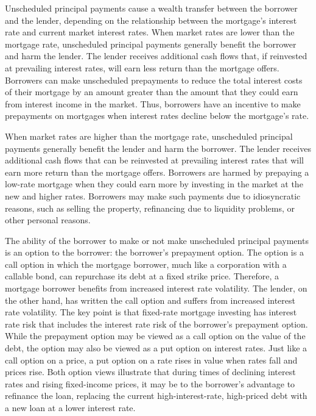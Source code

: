 \documentclass[11pt]{article}
\begin{document}
Unscheduled principal payments cause a wealth transfer between the borrower and the lender, depending on the relationship between the mortgage's interest rate and current market interest rates. When market rates are lower than the mortgage rate, unscheduled principal payments generally benefit the borrower and harm the lender. The lender receives additional cash flows that, if reinvested at prevailing interest rates, will earn less return than the mortgage offers. Borrowers can make unscheduled prepayments to reduce the total interest costs of their mortgage by an amount greater than the amount that they could earn from interest income in the market. Thus, borrowers have an incentive to make prepayments on mortgages when interest rates decline below the mortgage's rate.

When market rates are higher than the mortgage rate, unscheduled principal payments generally benefit the lender and harm the borrower. The lender receives additional cash flows that can be reinvested at prevailing interest rates that will earn more return than the mortgage offers. Borrowers are harmed by prepaying a low-rate mortgage when they could earn more by investing in the market at the new and higher rates. Borrowers may make such payments due to idiosyncratic reasons, such as selling the property, refinancing due to liquidity problems, or other personal reasons.

The ability of the borrower to make or not make unscheduled principal payments is an option to the borrower: the borrower's prepayment option. The option is a call option in which the mortgage borrower, much like a corporation with a callable bond, can repurchase its debt at a fixed strike price. Therefore, a mortgage borrower benefits from increased interest rate volatility. The lender, on the other hand, has written the call option and suffers from increased interest rate volatility. The key point is that fixed-rate mortgage investing has interest rate risk that includes the interest rate risk of the borrower's prepayment option. While the prepayment option may be viewed as a call option on the value of the debt, the option may also be viewed as a put option on interest rates. Just like a call option on a price, a put option on a rate rises in value when rates fall and prices rise. Both option views illustrate that during times of declining interest rates and rising fixed-income prices, it may be to the borrower's advantage to refinance the loan, replacing the current high-interest-rate, high-priced debt with a new loan at a lower interest rate.
\end{document}
